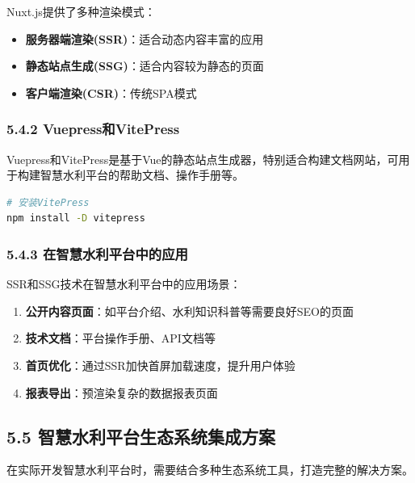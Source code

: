 Nuxt.js提供了多种渲染模式：

\begin{itemize}
\tightlist
\item
  \textbf{服务器端渲染(SSR)}：适合动态内容丰富的应用
\item
  \textbf{静态站点生成(SSG)}：适合内容较为静态的页面
\item
  \textbf{客户端渲染(CSR)}：传统SPA模式
\end{itemize}

\subsubsection{5.4.2 Vuepress和VitePress}\label{vuepressux548cvitepress}

Vuepress和VitePress是基于Vue的静态站点生成器，特别适合构建文档网站，可用于构建智慧水利平台的帮助文档、操作手册等。

\begin{lstlisting}[language=bash]
# 安装VitePress
npm install -D vitepress
\end{lstlisting}

\subsubsection{5.4.3
在智慧水利平台中的应用}\label{ux5728ux667aux6167ux6c34ux5229ux5e73ux53f0ux4e2dux7684ux5e94ux7528}

SSR和SSG技术在智慧水利平台中的应用场景：

\begin{enumerate}
\def\labelenumi{\arabic{enumi}.}
\tightlist
\item
  \textbf{公开内容页面}：如平台介绍、水利知识科普等需要良好SEO的页面
\item
  \textbf{技术文档}：平台操作手册、API文档等
\item
  \textbf{首页优化}：通过SSR加快首屏加载速度，提升用户体验
\item
  \textbf{报表导出}：预渲染复杂的数据报表页面
\end{enumerate}

\subsection{5.5
智慧水利平台生态系统集成方案}\label{ux667aux6167ux6c34ux5229ux5e73ux53f0ux751fux6001ux7cfbux7edfux96c6ux6210ux65b9ux6848}

在实际开发智慧水利平台时，需要结合多种生态系统工具，打造完整的解决方案。

